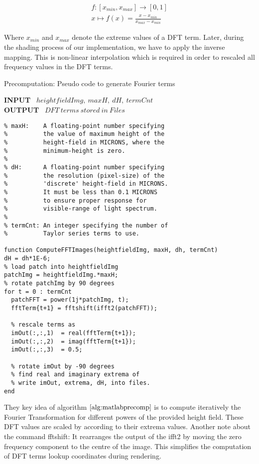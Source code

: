 \begin{align}
  f:\left[x_{min},x_{max}\right]\to \left[0,1\right] \nonumber\\
  x \mapsto f(x) = \frac{x-x_{min}}{x_{max}-x_{min}}
\label{eq:dfttermnormalization}
\end{align}

Where $x_{min}$ and $x_{max}$ denote the extreme values of a DFT term. Later, during the shading process of our implementation, we have to apply the inverse mapping. This is non-linear interpolation which is required in order to rescaled all frequency values in the DFT terms. 

\begin{algorithm}[H]
\caption{Precomputation: Pseudo code to generate Fourier terms}
\textbf{INPUT} \ $heightfieldImg, \ maxH, \ dH, \ termCnt$ \\
\textbf{OUTPUT} \ $DFT \ terms \ stored \ in \ Files$
\begin{lstlisting}
% maxH:    A floating-point number specifying 
%          the value of maximum height of the 
%          height-field in MICRONS, where the 
%          minimum-height is zero. 
%         
% dH:      A floating-point number specifying 
%          the resolution (pixel-size) of the 
%          'discrete' height-field in MICRONS. 
%          It must be less than 0.1 MICRONS 
%          to ensure proper response for 
%          visible-range of light spectrum.
%
% termCnt: An integer specifying the number of 
%          Taylor series terms to use.

function ComputeFFTImages(heightfieldImg, maxH, dh, termCnt)
dH = dh*1E-6;
% load patch into heightfieldImg
patchImg = heightfieldImg.*maxH;
% rotate patchImg by 90 degrees
for t = 0 : termCnt
  patchFFT = power(1j*patchImg, t);
  fftTerm{t+1} = fftshift(ifft2(patchFFT));
  
  % rescale terms as
  imOut(:,:,1)  = real(fftTerm{t+1});
  imOut(:,:,2)  = imag(fftTerm{t+1});
  imOut(:,:,3)  = 0.5;
  
  % rotate imOut by -90 degrees
  % find real and imaginary extrema of 
  % write imOut, extrema, dH, into files.
end
\end{lstlisting}
\label{alg:matlabprecomp}
\end{algorithm}

They key idea of algorithm $\ref{alg:matlabprecomp}$ is to compute iteratively the Fourier Transformation for different powers of the provided height field. These DFT values are scaled by according to their extrema values. Another note about the command fftshift: It rearranges the output of the ifft2 by moving the zero frequency component to the centre of the image. This simplifies the computation of DFT terms lookup coordinates during rendering.

